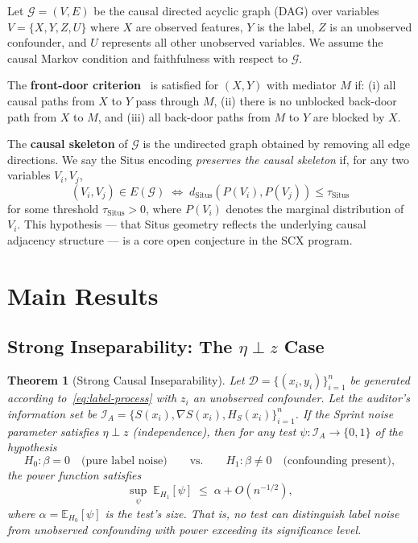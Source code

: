 \documentclass[12pt,a4paper]{article}
\newtheorem{theorem}{Theorem}[section]
\newcommand{\E}{\mathbb{E}}
\newcommand{\cD}{\mathcal{D}}
\newcommand{\cG}{\mathcal{G}}
\newcommand{\cI}{\mathcal{I}}
\newcommand{\Situs}{\mathrm{Situs}}
\begin{document}
Let $\cG = (V, E)$ be the causal directed acyclic graph (DAG) over variables
$V = \{X, Y, Z, U\}$ where $X$ are observed features, $Y$ is the label, $Z$ is
an unobserved confounder, and $U$ represents all other unobserved variables.
We assume the causal Markov condition and faithfulness with respect to $\cG$.

The \textbf{front-door criterion}~\citep{pearl2009causality} is satisfied for
$(X, Y)$ with mediator $M$ if: (i) all causal paths from $X$ to $Y$ pass
through $M$, (ii) there is no unblocked back-door path from $X$ to $M$, and
(iii) all back-door paths from $M$ to $Y$ are blocked by $X$.

The \textbf{causal skeleton} of $\cG$ is the undirected graph obtained by
removing all edge directions.  We say the Situs encoding \emph{preserves the
causal skeleton} if, for any two variables $V_i, V_j$,
\begin{equation}\label{eq:skeleton-preservation}
    (V_i, V_j) \in E(\cG) \;\Longleftrightarrow\;
    d_{\Situs}(P(V_i), P(V_j)) \leq \tau_{\Situs}
\end{equation}
for some threshold $\tau_{\Situs} > 0$, where $P(V_i)$ denotes the marginal
distribution of $V_i$.  This hypothesis — that Situs geometry reflects the
underlying causal adjacency structure — is a core open conjecture in the SCX
program.

\section{Main Results}

\subsection{Strong Inseparability: The $\eta \perp z$ Case}
\label{sec:strong}

\begin{theorem}[Strong Causal Inseparability]
\label{thm:strong-insep}
Let $\cD = \{(x_i, y_i)\}_{i=1}^n$ be generated according to~\eqref{eq:label-process}
with $z_i$ an unobserved confounder.  Let the auditor's information set be
$\cI_A = \{S(x_i), \nabla S(x_i), H_S(x_i)\}_{i=1}^n$.  If the Sprint noise
parameter satisfies $\eta \perp z$ (independence), then for any test
$\psi: \cI_A \to \{0,1\}$ of the hypothesis
\begin{equation*}
    H_0: \beta = 0 \quad\text{(pure label noise)}\qquad\text{vs.}\qquad
    H_1: \beta \neq 0 \quad\text{(confounding present)},
\end{equation*}
the power function satisfies
\begin{equation}\label{eq:power-bound}
    \sup_{\psi}\; \E_{H_1}[\psi] \;\leq\; \alpha + O(n^{-1/2}),
\end{equation}
where $\alpha = \E_{H_0}[\psi]$ is the test's size.  That is, no test can
distinguish label noise from unobserved confounding with power exceeding its
significance level.
\end{theorem}
\end{document}

